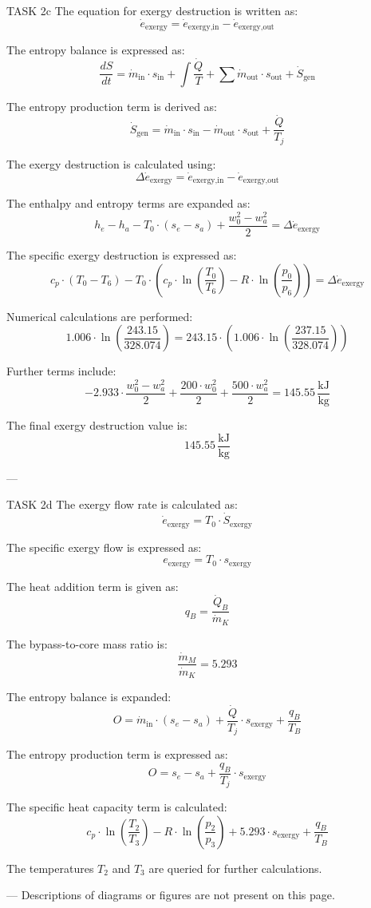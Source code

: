 TASK 2c  
The equation for exergy destruction is written as:  
\[
\dot{e}_{\text{exergy}} = \dot{e}_{\text{exergy,in}} - \dot{e}_{\text{exergy,out}}
\]  

The entropy balance is expressed as:  
\[
\frac{dS}{dt} = \dot{m}_{\text{in}} \cdot s_{\text{in}} + \int \frac{\dot{Q}}{T} + \sum \dot{m}_{\text{out}} \cdot s_{\text{out}} + \dot{S}_{\text{gen}}
\]  

The entropy production term is derived as:  
\[
\dot{S}_{\text{gen}} = \dot{m}_{\text{in}} \cdot s_{\text{in}} - \dot{m}_{\text{out}} \cdot s_{\text{out}} + \frac{\dot{Q}}{T_j}
\]  

The exergy destruction is calculated using:  
\[
\Delta \dot{e}_{\text{exergy}} = \dot{e}_{\text{exergy,in}} - \dot{e}_{\text{exergy,out}}
\]  

The enthalpy and entropy terms are expanded as:  
\[
h_e - h_a - T_0 \cdot (s_e - s_a) + \frac{w_0^2 - w_a^2}{2} = \Delta \dot{e}_{\text{exergy}}
\]  

The specific exergy destruction is expressed as:  
\[
c_p \cdot (T_0 - T_6) - T_0 \cdot \left( c_p \cdot \ln \left( \frac{T_0}{T_6} \right) - R \cdot \ln \left( \frac{p_0}{p_6} \right) \right) = \Delta \dot{e}_{\text{exergy}}
\]  

Numerical calculations are performed:  
\[
1.006 \cdot \ln \left( \frac{243.15}{328.074} \right) = 243.15 \cdot \left( 1.006 \cdot \ln \left( \frac{237.15}{328.074} \right) \right)
\]  

Further terms include:  
\[
-2.933 \cdot \frac{w_0^2 - w_a^2}{2} + \frac{200 \cdot w_0^2}{2} + \frac{500 \cdot w_a^2}{2} = 145.55 \, \frac{\text{kJ}}{\text{kg}}
\]  

The final exergy destruction value is:  
\[
145.55 \, \frac{\text{kJ}}{\text{kg}}
\]  

---

TASK 2d  
The exergy flow rate is calculated as:  
\[
\dot{e}_{\text{exergy}} = T_0 \cdot \dot{S}_{\text{exergy}}
\]  

The specific exergy flow is expressed as:  
\[
e_{\text{exergy}} = T_0 \cdot s_{\text{exergy}}
\]  

The heat addition term is given as:  
\[
q_B = \frac{\dot{Q}_B}{\dot{m}_K}
\]  

The bypass-to-core mass ratio is:  
\[
\frac{\dot{m}_M}{\dot{m}_K} = 5.293
\]  

The entropy balance is expanded:  
\[
O = \dot{m}_{\text{in}} \cdot (s_e - s_a) + \frac{\dot{Q}}{T_j} \cdot s_{\text{exergy}} + \frac{q_B}{T_B}
\]  

The entropy production term is expressed as:  
\[
O = s_e - s_a + \frac{q_B}{T_j} \cdot s_{\text{exergy}}
\]  

The specific heat capacity term is calculated:  
\[
c_p \cdot \ln \left( \frac{T_2}{T_3} \right) - R \cdot \ln \left( \frac{p_2}{p_3} \right) + 5.293 \cdot s_{\text{exergy}} + \frac{q_B}{T_B}
\]  

The temperatures \( T_2 \) and \( T_3 \) are queried for further calculations.  

---  
Descriptions of diagrams or figures are not present on this page.